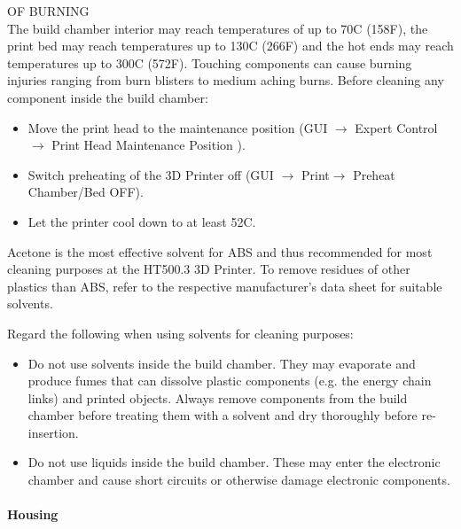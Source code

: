 \begin{danger}
  OF BURNING\\
  The build chamber interior may reach temperatures of up to 70\degree C (158\degree F), the print bed may reach temperatures up to 130\degree C (266\degree F) and 
  the hot ends may reach temperatures up to 300\degree C (572\degree F). Touching components can cause burning injuries ranging from burn blisters to medium aching burns. Before cleaning any component inside the build chamber:
  
  \begin{itemize}
    \item Move the print head to the maintenance position 
          (GUI $\rightarrow$ \lbrack Expert Control\rbrack  $\rightarrow$ \lbrack Print Head Maintenance Position \rbrack  ).
    \item Switch preheating of the 3D Printer off 
          (GUI $\rightarrow$ \lbrack Print\rbrack  $\rightarrow$ \lbrack Preheat Chamber/Bed OFF\rbrack  ).
    \item Let the printer cool down to at least 52\degree C.
  \end{itemize}
\end{danger}

\begin{notice}  
  Acetone is the most effective solvent for ABS and thus recommended for most cleaning purposes at the HT500.3 3D Printer.
  To remove residues of other plastics than ABS, refer to the respective manufacturer's data sheet for suitable solvents.

  Regard the following when using solvents for cleaning purposes:

  \begin{itemize}
    \item Do not use solvents inside the build chamber. They may evaporate and produce fumes that can dissolve plastic 
          components (e.g. the energy chain links) and printed objects. Always remove components from the build chamber before treating them with a solvent and dry thoroughly before re-insertion.
    \item Do not use liquids inside the build chamber. These may enter the electronic chamber and cause short circuits or
          otherwise damage electronic components.
  \end{itemize}
\end{notice}


\paragraph{Housing}

